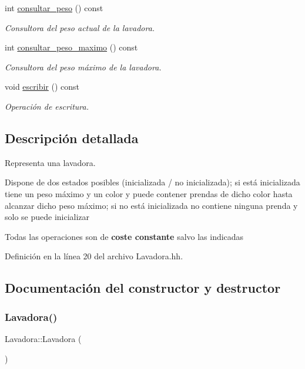 \begin{DoxyCompactItemize}
int \mbox{\hyperlink{class_lavadora_a411751a432a84ab91196e6b827190f05}{consultar\+\_\+peso}} () const
\begin{DoxyCompactList}\small\item\em Consultora del peso actual de la lavadora. \end{DoxyCompactList}\item 
int \mbox{\hyperlink{class_lavadora_a725ef6a2786b400e0cffebe7a690602e}{consultar\+\_\+peso\+\_\+maximo}} () const
\begin{DoxyCompactList}\small\item\em Consultora del peso máximo de la lavadora. \end{DoxyCompactList}\item 
void \mbox{\hyperlink{class_lavadora_a2372c33a5f76dda6e3892d118ae726f1}{escribir}} () const
\begin{DoxyCompactList}\small\item\em Operación de escritura. \end{DoxyCompactList}\end{DoxyCompactItemize}


\subsection{Descripción detallada}
Representa una lavadora. 

Dispone de dos estados posibles (inicializada / no inicializada); si está inicializada tiene un peso máximo y un color y puede contener prendas de dicho color hasta alcanzar dicho peso máximo; si no está inicializada no contiene ninguna prenda y solo se puede inicializar

Todas las operaciones son de {\bfseries coste constante} salvo las indicadas 

Definición en la línea 20 del archivo Lavadora.\+hh.



\subsection{Documentación del constructor y destructor}
\mbox{\label{class_lavadora_a2366b1cd0ba86f8ef8ba8504067dc114}} 
\subsubsection{\texorpdfstring{Lavadora()}{Lavadora()}}
{\footnotesize\ttfamily Lavadora\+::\+Lavadora (\begin{DoxyParamCaption}{ }\end{DoxyParamCaption})}




